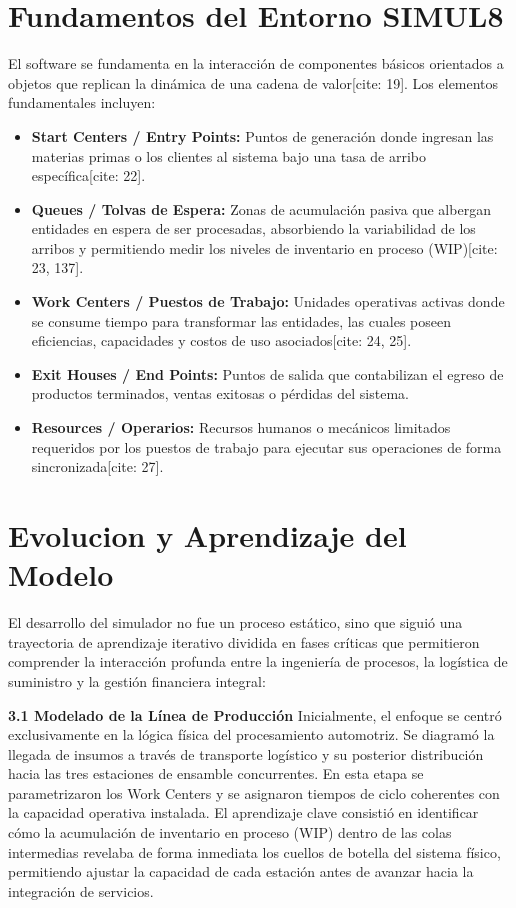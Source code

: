 \documentclass[11pt,a4paper]{article}
\begin{document}
\section{Fundamentos del Entorno SIMUL8}
El software se fundamenta en la interacción de componentes básicos orientados a objetos que replican la dinámica de una cadena de valor[cite: 19]. Los elementos fundamentales incluyen:
\begin{itemize}
    \item \textbf{Start Centers / Entry Points:} Puntos de generación donde ingresan las materias primas o los clientes al sistema bajo una tasa de arribo específica[cite: 22].
    \item \textbf{Queues / Tolvas de Espera:} Zonas de acumulación pasiva que albergan entidades en espera de ser procesadas, absorbiendo la variabilidad de los arribos y permitiendo medir los niveles de inventario en proceso (WIP)[cite: 23, 137].
    \item \textbf{Work Centers / Puestos de Trabajo:} Unidades operativas activas donde se consume tiempo para transformar las entidades, las cuales poseen eficiencias, capacidades y costos de uso asociados[cite: 24, 25].
    \item \textbf{Exit Houses / End Points:} Puntos de salida que contabilizan el egreso
de productos terminados, ventas exitosas o pérdidas del sistema.
    \item \textbf{Resources / Operarios:} Recursos humanos o mecánicos limitados requeridos por los puestos de trabajo para ejecutar sus operaciones de forma sincronizada[cite: 27].
\end{itemize}

\section{Evolucion y Aprendizaje del Modelo}
El desarrollo del simulador no fue un proceso estático, sino que siguió una trayectoria de aprendizaje iterativo dividida en fases críticas que permitieron comprender la interacción profunda entre la ingeniería de procesos, la logística de suministro y la gestión financiera integral:

\textbf{3.1 Modelado de la Línea de Producción}
Inicialmente, el enfoque se centró exclusivamente en la lógica física del procesamiento automotriz. Se diagramó la llegada de insumos a través de transporte logístico y su posterior distribución hacia las tres estaciones de ensamble concurrentes. En esta etapa se parametrizaron los Work Centers y se asignaron tiempos de ciclo coherentes con la capacidad operativa instalada. El aprendizaje clave consistió en identificar cómo la acumulación de inventario en proceso (WIP) dentro de las colas intermedias revelaba de forma inmediata los cuellos de botella del sistema físico, permitiendo ajustar la capacidad de cada estación antes de avanzar hacia la integración de servicios.
\end{document}
